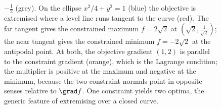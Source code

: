 \begin{figure}[htbp]
{$-\tfrac{1}{2}$ (grey). On the ellipse $x^{2}/4 + y^{2} = 1$ (blue) the
objective is extremised where a level line runs tangent to the curve (red).
The far tangent gives the constrained maximum $f = 2\sqrt{2}$ at
$(\sqrt{2}, \tfrac{1}{\sqrt{2}})$; the near tangent gives the constrained
minimum $f = -2\sqrt{2}$ at the antipodal point. At both, the objective
gradient $(1, 2)$ is parallel to the constraint gradient (orange), which is
the Lagrange condition; the multiplier is positive at the maximum and
negative at the minimum, because the two constraint normals point in
opposite senses relative to $\grad f$. One constraint yields two optima, the
generic feature of extremising over a closed curve.}
\label{fig:vol02:ch11:ellipse-extrema}
\end{figure}
